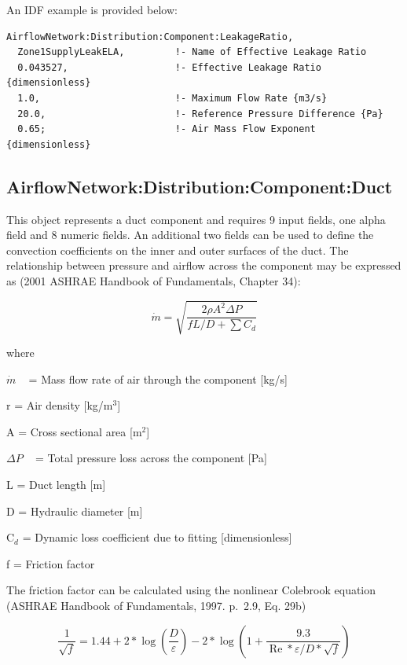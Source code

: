 An IDF example is provided below:

\begin{lstlisting}
AirflowNetwork:Distribution:Component:LeakageRatio,
  Zone1SupplyLeakELA,         !- Name of Effective Leakage Ratio
  0.043527,                   !- Effective Leakage Ratio {dimensionless}
  1.0,                        !- Maximum Flow Rate {m3/s}
  20.0,                       !- Reference Pressure Difference {Pa}
  0.65;                       !- Air Mass Flow Exponent {dimensionless}
\end{lstlisting}

\subsection{AirflowNetwork:Distribution:Component:Duct}\label{airflownetworkdistributioncomponentduct}

This object represents a duct component and requires 9 input fields, one alpha field and 8 numeric fields. An additional two fields can be used to define the convection coefficients on the inner and outer surfaces of the duct. The relationship between pressure and airflow across the component may be expressed as (2001 ASHRAE Handbook of Fundamentals, Chapter 34):

\begin{equation}
\dot m = \sqrt {\frac{{2\rho {A^2}\Delta P}}{{fL/D + \sum {C_d}}}}
\end{equation}

where

\(\dot m\) ~ = Mass flow rate of air through the component {[}kg/s{]}

r = Air density {[}kg/m\(^{3}\){]}

A = Cross sectional area {[}m\(^{2}\){]}

\(\Delta P\) ~ = Total pressure loss across the component {[}Pa{]}

L = Duct length {[}m{]}

D = Hydraulic diameter {[}m{]}

C\(_{d}\) = Dynamic loss coefficient due to fitting {[}dimensionless{]}

f = Friction factor

The friction factor can be calculated using the nonlinear Colebrook equation (ASHRAE Handbook of Fundamentals, 1997. p.~2.9, Eq. 29b)

\begin{equation}
\frac{1}{{\sqrt f }} = 1.44 + 2*\log \left( {\frac{D}{\varepsilon }} \right) - 2*\log \left( {1 + \frac{{9.3}}{{\operatorname{Re} *\varepsilon /D*\sqrt f }}} \right)
\end{equation}

